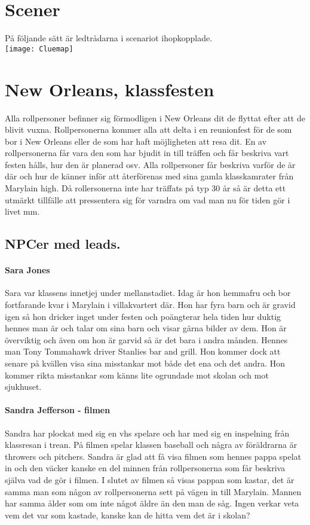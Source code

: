 \section{Scener}
På följande sätt är ledtrådarna i scenariot ihopkopplade.\\
\texttt{[image: Cluemap]}
\section{New Orleans, klassfesten}
Alla rollpersoner befinner sig förmodligen i New Orleans dit de flyttat efter att de blivit vuxna. Rollpersonerna kommer alla att delta i en reunionfest för de som bor i New Orleans eller de som har haft möjligheten att resa dit. En av rollpersonerna får vara den som har bjudit in till träffen och får beskriva vart festen hålls, hur den är planerad osv. Alla rollpersoner får beskriva varför de är där och hur de känner inför att återförenas med sina gamla klasskamrater från Marylain high. Då rollersonerna inte har träffats på typ 30 år så är detta ett utmärkt tillfälle att pressentera sig för varndra om vad man nu för tiden gör i livet mm.
\subsection{NPCer med leads.}
\paragraph{Sara Jones}
Sara var klassens innetjej under mellanstadiet. Idag är hon hemmafru och bor fortfarande kvar i Marylain i villakvartert där. Hon har fyra barn och är gravid igen så hon dricker inget under festen och poängterar hela tiden hur duktig hennes man är och talar om sina barn och visar gärna bilder av dem. Hon är överviktig och även om hon är garvid så är det bara i andra månden. Hennes man Tony Tommahawk driver Stanlies bar and grill. Hon kommer dock att senare på kvällen visa sina misstankar mot både det ena och det andra. Hon kommer rikta misstankar som känns lite ogrundade mot skolan och mot sjukhuset.
\paragraph{Sandra Jefferson - filmen}
Sandra har plockat med sig en vhs spelare och har med sig en inspelning från klassresan i trean. På filmen spelar klassen baseball och några av föräldrarna är throwers och pitchers. Sandra är glad att få visa filmen som hennes pappa spelat in och den väcker kanske en del minnen från rollpersonerna som får beskriva själva vad de gör i filmen. I slutet av filmen så visas pappan som kastar, det är samma man som någon av rollpersonerna sett på vägen in till Marylain. Mannen har samma ålder som om inte något äldre än den man de såg. Ingen verkar veta vem det var som kastade, kanske kan de hitta vem det är i skolan?
